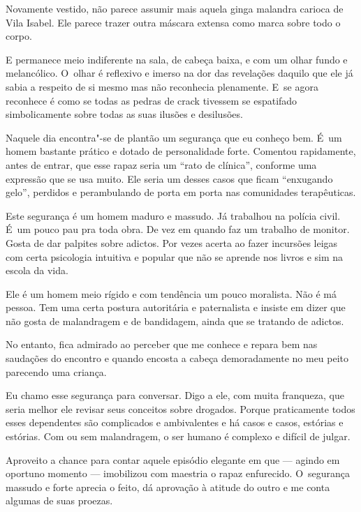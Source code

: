 Novamente vestido,  não parece assumir mais aquela ginga malandra
carioca de Vila Isabel. Ele parece trazer outra máscara extensa como
marca sobre todo o corpo.

E permanece meio indiferente na sala, de cabeça baixa, e com um olhar
fundo e melancólico. O~olhar é reflexivo e imerso na dor das revelações
daquilo que ele já sabia a respeito de si mesmo mas não reconhecia
plenamente. E~se agora reconhece é como se todas as pedras de crack
tivessem se espatifado simbolicamente sobre todas as suas ilusões e
desilusões.

\asterisc{}

Naquele dia encontra"-se de plantão um segurança que eu conheço bem. É~um
homem bastante prático e dotado de personalidade forte. Comentou
rapidamente, antes de  entrar, que esse rapaz seria um ``rato de
clínica'', conforme uma expressão que se usa muito. Ele seria um desses
casos que ficam ``enxugando gelo'', perdidos e perambulando de porta em
porta nas comunidades terapêuticas.

Este segurança é um homem maduro e massudo. Já trabalhou na polícia
civil. É~um pouco pau pra toda obra. De vez em quando faz um trabalho de
monitor. Gosta de dar palpites sobre adictos. Por vezes acerta ao fazer
incursões leigas com certa psicologia intuitiva e popular que não se
aprende nos livros e sim na escola da vida.

Ele é um homem meio rígido e com tendência um pouco moralista. Não é má
pessoa. Tem uma certa postura autoritária e paternalista e insiste em
dizer que não gosta de malandragem e de bandidagem, ainda que se
tratando de adictos.

No entanto, fica admirado ao perceber que  me conhece e repara bem nas
saudações do encontro e quando  encosta a cabeça demoradamente no meu
peito parecendo uma criança.

Eu chamo esse segurança para conversar. Digo a ele, com muita franqueza,
que seria melhor ele revisar seus conceitos sobre drogados. Porque
praticamente todos esses dependentes são complicados e ambivalentes e há
casos e casos, estórias e estórias. Com ou sem malandragem, o ser humano
é complexo e difícil de julgar.

Aproveito a chance para contar aquele episódio elegante em que  ---
agindo em oportuno momento --- imobilizou com maestria o rapaz
enfurecido. O~segurança massudo e forte aprecia o feito, dá aprovação à
atitude do outro e me conta algumas de suas proezas.

